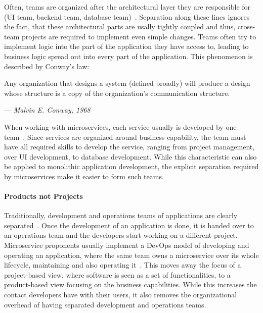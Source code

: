 Often, teams are organized after the architectural layer they are responsible for (\ac{UI} team, backend team, database team)~\cite{Kim2016, Lewis2014}.
Separation along these lines ignores the fact, that these architectural parts are usally tightly coupled and thus, cross-team projects are required to implement even simple changes.
Teams often try to implement logic into the part of the application they have access to, leading to business logic spread out into every part of the application.
This phenomenon is described by Conway's law:

\begin{displayquote}
    Any organization that designs a system (defined broadly) will produce a design whose structure is a copy of the organization's communication structure.
    \begin{flushright}
        --- \textit{Malvin E. Conway, 1968~\cite{Conway1968}}
    \end{flushright}
\end{displayquote}

When working with microservices, each service usually is developed by one team~\cite{Baresi2020, Mazzara2020, Lewis2014}.
Since services are organized around business capability, the team must have all required skills to develop the service, ranging from project management, over \ac{UI} development, to database development.
While this characteristic can also be applied to monolithic application development, the explicit separation required by microservices make it easier to form such teams.

\paragraph{Products not Projects}

Traditionally, development and operations teams of applications are clearly separated~\cite{Kim2016}.
Once the development of an application is done, it is handed over to an operations team and the developers start working on a different project.
Microservice proponents usually implement a DevOps model of developing and operating an application, where the same team owns a microservice over its whole lifecycle, maintaining and also operating it~\cite{Lewis2014}.
This moves away the focus of a project-based view, where software is seen as a set of functionalities, to a product-based view focusing on the business capabilities.
While this increases the contact developers have with their users, it also removes the organizational overhead of having separated development and operations teams.

